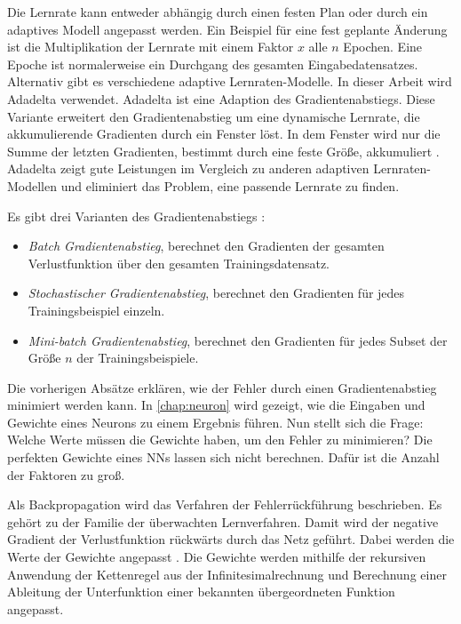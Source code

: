 Die Lernrate kann entweder abhängig durch einen festen Plan oder durch ein adaptives Modell angepasst werden. Ein Beispiel für eine fest geplante Änderung ist die Multiplikation der Lernrate mit einem Faktor $x$ alle $n$ Epochen. Eine Epoche ist normalerweise ein Durchgang des gesamten Eingabedatensatzes. Alternativ gibt es verschiedene adaptive Lernraten-Modelle. In dieser Arbeit wird \zb{} Adadelta verwendet. Adadelta ist eine Adaption des Gradientenabstiegs. Diese Variante erweitert den Gradientenabstieg um eine dynamische Lernrate, die akkumulierende Gradienten durch ein Fenster löst. In dem Fenster wird nur die Summe der letzten Gradienten, bestimmt durch eine feste Größe, akkumuliert \cite{Zeiler2012}. Adadelta zeigt gute Leistungen im Vergleich zu anderen adaptiven Lernraten-Modellen und eliminiert das Problem, eine passende Lernrate zu finden.

Es gibt drei Varianten des Gradientenabstiegs \cite{Ruder2016}:
\begin{itemize}
  \item \emph{Batch Gradientenabstieg}, berechnet den Gradienten der gesamten Verlustfunktion über den gesamten Trainingsdatensatz. 
  \item \emph{Stochastischer Gradientenabstieg}, berechnet den Gradienten für jedes Trainingsbeispiel einzeln.
  \item \emph{Mini-batch Gradientenabstieg}, berechnet den Gradienten für jedes Subset der Größe $n$ der Trainingsbeispiele.
\end{itemize}

Die vorherigen Absätze erklären, wie der Fehler durch einen Gradientenabstieg minimiert werden kann. In \autoref{chap:neuron} wird gezeigt, wie die Eingaben und Gewichte eines Neurons zu einem Ergebnis führen. Nun stellt sich die Frage: Welche Werte müssen die Gewichte haben, um den Fehler zu minimieren? Die perfekten Gewichte eines \acp{NN} lassen sich nicht berechnen. Dafür ist die Anzahl der Faktoren zu groß.

Als Backpropagation wird das Verfahren der Fehlerrückführung beschrieben. Es gehört zu der Familie der überwachten Lernverfahren. Damit wird der negative Gradient der Verlustfunktion rückwärts durch das Netz geführt. Dabei werden die Werte der Gewichte angepasst \cite{Wythoff1993}. Die Gewichte werden mithilfe der rekursiven Anwendung der Kettenregel aus der Infinitesimalrechnung und Berechnung einer Ableitung der Unterfunktion einer bekannten übergeordneten Funktion angepasst.

